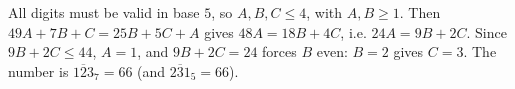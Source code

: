 All digits must be valid in base $5$, so $A,B,C\le4$, with $A,B\ge1$. Then $49A+7B+C=25B+5C+A$ gives $48A=18B+4C$, i.e. $24A=9B+2C$. Since $9B+2C\le44$, $A=1$, and $9B+2C=24$ forces $B$ even: $B=2$ gives $C=3$. The number is $\overline{123}_7=\boxed{66}$ (and $\overline{231}_5=66$).
